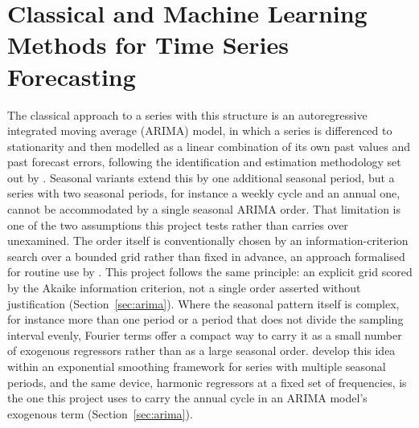 \documentclass[12pt,a4paper]{report}
\begin{document}
\section{Classical and Machine Learning Methods for Time Series Forecasting}
\label{sec:lit-ml}

The classical approach to a series with this structure is an autoregressive
integrated moving average (ARIMA) model, in which a series is differenced to
stationarity and then modelled as a linear combination of its own past values
and past forecast errors, following the identification and estimation
methodology set out by \citet{box2008time}. Seasonal variants extend this by
one additional seasonal period, but a series with two seasonal periods, for
instance a weekly cycle and an annual one, cannot be accommodated by a single
seasonal ARIMA order. That limitation is one of the two assumptions this
project tests rather than carries over unexamined. The order itself is
conventionally chosen by an information-criterion search over a bounded grid
rather than fixed in advance, an approach formalised for routine use by
\citet{hyndman2008autoarima}. This project follows the same principle: an
explicit grid scored by the Akaike information criterion, not a single
order asserted without justification (Section~\ref{sec:arima}). Where the
seasonal pattern itself is complex, for instance more than one period or a
period that does not divide the sampling interval evenly, Fourier terms
offer a compact way to carry it as a small number of exogenous regressors
rather than as a large seasonal order. \citet{delivera2011fourier} develop
this idea within an exponential smoothing framework for series with multiple
seasonal periods, and the same device, harmonic regressors at a fixed set of
frequencies, is the one this project uses to carry the annual cycle in an
ARIMA model's exogenous term (Section~\ref{sec:arima}).
\end{document}
